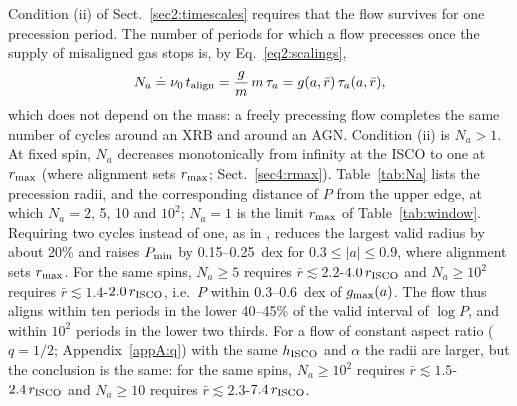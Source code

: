 Condition (ii) of Sect.~\ref{sec2:timescales} requires that the flow survives for one precession period.
The number of periods for which a flow precesses once the supply of misaligned gas stops is, by Eq.~\eqref{eq2:scalings},
\begin{equation}
    \label{eq5:Na}
    N_a\doteq\nu_0\,t_\textup{align}=\frac{g}{m}\,m\,\tau_a=g(a,\bar r)\,\tau_a(a,\bar r),
\end{equation}
which does not depend on the mass: a freely precessing flow completes the same number of cycles around an XRB and around an AGN.
Condition (ii) is $N_a>1$.
At fixed spin, $N_a$ decreases monotonically from infinity at the ISCO to one at $r_\textup{max}$ (where alignment sets $r_\textup{max}$; Sect.~\ref{sec4:rmax}).
Table~\ref{tab:Na} lists the precession radii, and the corresponding distance of $P$ from the upper edge, at which $N_a=2$, 5, 10 and $10^2$; $N_a=1$ is the limit $r_\textup{max}$ of Table~\ref{tab:window}.
Requiring two cycles instead of one, as in \citet{Motta2017}, reduces the largest valid radius by about 20\% and raises $P_\textup{min}$ by 0.15--0.25~dex for $0.3\leq|a|\leq0.9$, where alignment sets $r_\textup{max}$.
For the same spins, $N_a\geq5$ requires $\bar r\lesssim2.2$-$4.0\,r_\textup{ISCO}$ and $N_a\geq10^2$ requires $\bar r\lesssim1.4$-$2.0\,r_\textup{ISCO}$, i.e.\ $P$ within 0.3--0.6~dex of $g_\textup{max}(a)$.
The flow thus aligns within ten periods in the lower 40--45\% of the valid interval of $\log P$, and within $10^2$ periods in the lower two thirds.
For a flow of constant aspect ratio ($q=1/2$; Appendix~\ref{appA:q}) with the same $h_\textup{ISCO}$ and $\alpha$ the radii are larger, but the conclusion is the same: for the same spins, $N_a\geq10^2$ requires $\bar r\lesssim1.5$-$2.4\,r_\textup{ISCO}$ and $N_a\geq10$ requires $\bar r\lesssim2.3$-$7.4\,r_\textup{ISCO}$.

